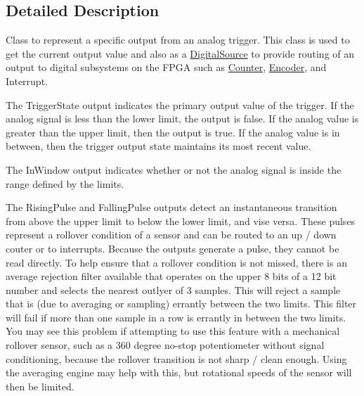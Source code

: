 \subsection{Detailed Description}
Class to represent a specific output from an analog trigger. This class is used to get the current output value and also as a \hyperlink{classDigitalSource}{DigitalSource} to provide routing of an output to digital subsystems on the FPGA such as \hyperlink{classCounter}{Counter}, \hyperlink{classEncoder}{Encoder}, and Interrupt.

The TriggerState output indicates the primary output value of the trigger. If the analog signal is less than the lower limit, the output is false. If the analog value is greater than the upper limit, then the output is true. If the analog value is in between, then the trigger output state maintains its most recent value.

The InWindow output indicates whether or not the analog signal is inside the range defined by the limits.

The RisingPulse and FallingPulse outputs detect an instantaneous transition from above the upper limit to below the lower limit, and vise versa. These pulses represent a rollover condition of a sensor and can be routed to an up / down couter or to interrupts. Because the outputs generate a pulse, they cannot be read directly. To help ensure that a rollover condition is not missed, there is an average rejection filter available that operates on the upper 8 bits of a 12 bit number and selects the nearest outlyer of 3 samples. This will reject a sample that is (due to averaging or sampling) errantly between the two limits. This filter will fail if more than one sample in a row is errantly in between the two limits. You may see this problem if attempting to use this feature with a mechanical rollover sensor, such as a 360 degree no-\/stop potentiometer without signal conditioning, because the rollover transition is not sharp / clean enough. Using the averaging engine may help with this, but rotational speeds of the sensor will then be limited. 

